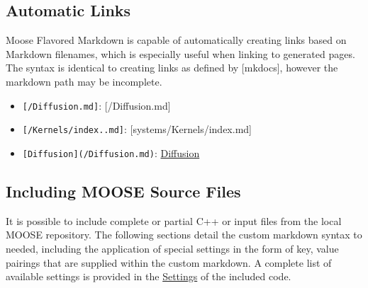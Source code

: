 \documentclass[]{report}
\begin{document}
\subsection{Automatic Links\label{automatic-links}}
\par
Moose Flavored Markdown is capable of automatically creating links based on Markdown filenames, which is
especially useful when linking to generated pages. The syntax is identical to creating links as
defined by [mkdocs], however the markdown path may be incomplete.\begin{itemize}
\item \texttt{[/Diffusion.md]}: [/Diffusion.md]
\item \texttt{[/Kernels/index..md]}: [systems/Kernels/index.md]
\item \texttt{[Diffusion](/Diffusion.md)}: \href{/Diffusion.md}{Diffusion}
\end{itemize}\subsection{Including MOOSE Source Files\label{including-moose-source-files}}
\par
It is possible to include complete or partial C++ or input files from the local MOOSE repository. The following sections detail the custom
markdown syntax to needed, including the application of special settings in the form of key, value pairings that are supplied within
the custom markdown. A complete list of available settings is provided in the \href{MooseFlavoredMarkdown.md#optional-settings}{Settings} of the included code.
\end{document}
